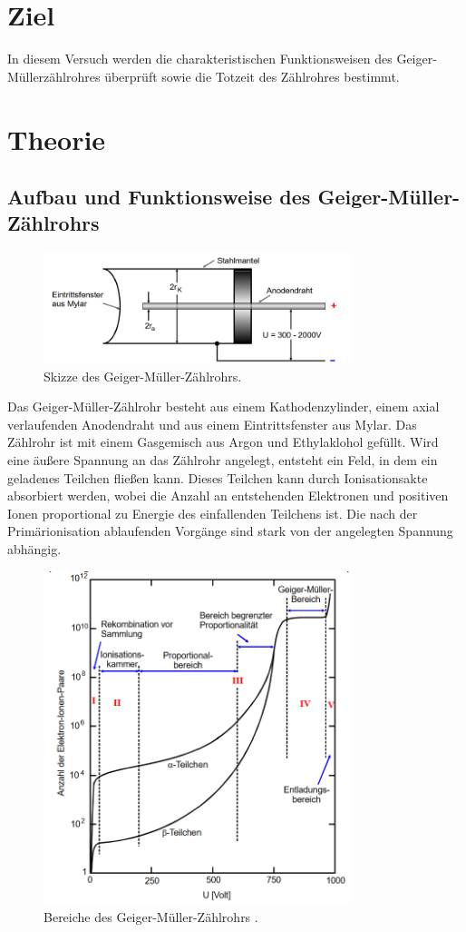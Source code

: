 

\section{Ziel}
In diesem Versuch werden die charakteristischen Funktionsweisen des Geiger-Müllerzählrohres überprüft sowie die Totzeit des Zählrohres bestimmt.

\section{Theorie}
\subsection{Aufbau und Funktionsweise des Geiger-Müller-Zählrohrs}
\begin{figure}[H] 
  \centering 
  \includegraphics[width=9cm]{content/1.png} 
  \caption{Skizze des Geiger-Müller-Zählrohrs. \cite{sample}} \label{fig:1} 
\end{figure}
Das Geiger-Müller-Zählrohr besteht aus einem Kathodenzylinder, einem axial verlaufenden Anodendraht und aus einem Eintrittsfenster aus Mylar. Das Zählrohr ist mit einem Gasgemisch aus Argon und Ethylaklohol gefüllt. Wird eine äußere Spannung an das Zählrohr angelegt, entsteht ein Feld, in dem ein geladenes Teilchen fließen kann. Dieses Teilchen kann durch Ionisationsakte absorbiert werden, wobei die Anzahl an entstehenden Elektronen und positiven Ionen proportional zu Energie des einfallenden Teilchens ist. Die nach der Primärionisation ablaufenden Vorgänge sind stark von der angelegten Spannung abhängig.\\
\begin{figure}[H] 
  \centering 
  \includegraphics[width=9cm]{content/2.png} 
  \caption{Bereiche des Geiger-Müller-Zählrohrs \cite{sample}.} \label{fig:2} 
\end{figure}

